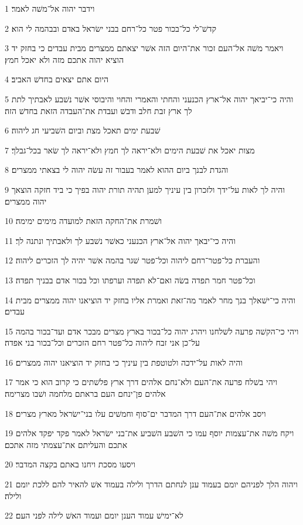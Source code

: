 \par 1 וידבר יהוה אל־משׁה לאמר׃
\par 2 קדשׁ־לי כל־בכור פטר כל־רחם בבני ישׂראל באדם ובבהמה לי הוא׃
\par 3 ויאמר משׁה אל־העם זכור את־היום הזה אשׁר יצאתם ממצרים מבית עבדים כי בחזק יד הוציא יהוה אתכם מזה ולא יאכל חמץ׃
\par 4 היום אתם יצאים בחדשׁ האביב׃
\par 5 והיה כי־יביאך יהוה אל־ארץ הכנעני והחתי והאמרי והחוי והיבוסי אשׁר נשׁבע לאבתיך לתת לך ארץ זבת חלב ודבשׁ ועבדת את־העבדה הזאת בחדשׁ הזה׃
\par 6 שׁבעת ימים תאכל מצת וביום השׁביעי חג ליהוה׃
\par 7 מצות יאכל את שׁבעת הימים ולא־יראה לך חמץ ולא־יראה לך שׂאר בכל־גבלך׃
\par 8 והגדת לבנך ביום ההוא לאמר בעבור זה עשׂה יהוה לי בצאתי ממצרים׃
\par 9 והיה לך לאות על־ידך ולזכרון בין עיניך למען תהיה תורת יהוה בפיך כי ביד חזקה הוצאך יהוה ממצרים׃
\par 10 ושׁמרת את־החקה הזאת למועדה מימים ימימה׃
\par 11 והיה כי־יבאך יהוה אל־ארץ הכנעני כאשׁר נשׁבע לך ולאבתיך ונתנה לך׃
\par 12 והעברת כל־פטר־רחם ליהוה וכל־פטר שׁגר בהמה אשׁר יהיה לך הזכרים ליהוה׃
\par 13 וכל־פטר חמר תפדה בשׂה ואם־לא תפדה וערפתו וכל בכור אדם בבניך תפדה׃
\par 14 והיה כי־ישׁאלך בנך מחר לאמר מה־זאת ואמרת אליו בחזק יד הוציאנו יהוה ממצרים מבית עבדים׃
\par 15 ויהי כי־הקשׁה פרעה לשׁלחנו ויהרג יהוה כל־בכור בארץ מצרים מבכר אדם ועד־בכור בהמה על־כן אני זבח ליהוה כל־פטר רחם הזכרים וכל־בכור בני אפדה׃
\par 16 והיה לאות על־ידכה ולטוטפת בין עיניך כי בחזק יד הוציאנו יהוה ממצרים׃
\par 17 ויהי בשׁלח פרעה את־העם ולא־נחם אלהים דרך ארץ פלשׁתים כי קרוב הוא כי אמר אלהים פן־ינחם העם בראתם מלחמה ושׁבו מצרימה׃
\par 18 ויסב אלהים את־העם דרך המדבר ים־סוף וחמשׁים עלו בני־ישׂראל מארץ מצרים׃
\par 19 ויקח משׁה את־עצמות יוסף עמו כי השׁבע השׁביע את־בני ישׂראל לאמר פקד יפקד אלהים אתכם והעליתם את־עצמתי מזה אתכם׃
\par 20 ויסעו מסכת ויחנו באתם בקצה המדבר׃
\par 21 ויהוה הלך לפניהם יומם בעמוד ענן לנחתם הדרך ולילה בעמוד אשׁ להאיר להם ללכת יומם ולילה׃
\par 22 לא־ימישׁ עמוד הענן יומם ועמוד האשׁ לילה לפני העם׃

